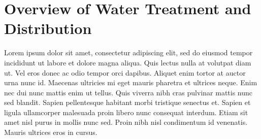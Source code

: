 
\chapter{Overview of Water Treatment and Distribution}



Lorem ipsum dolor sit amet, consectetur adipiscing elit, sed do eiusmod tempor incididunt ut labore et dolore magna aliqua. Quis lectus nulla at volutpat diam ut. Vel eros donec ac odio tempor orci dapibus. Aliquet enim tortor at auctor urna nunc id. Maecenas ultricies mi eget mauris pharetra et ultrices neque. Enim nec dui nunc mattis enim ut tellus. Quis viverra nibh cras pulvinar mattis nunc sed blandit. Sapien pellentesque habitant morbi tristique senectus et. Sapien et ligula ullamcorper malesuada proin libero nunc consequat interdum. Etiam sit amet nisl purus in mollis nunc sed. Proin nibh nisl condimentum id venenatis. Mauris ultrices eros in cursus.